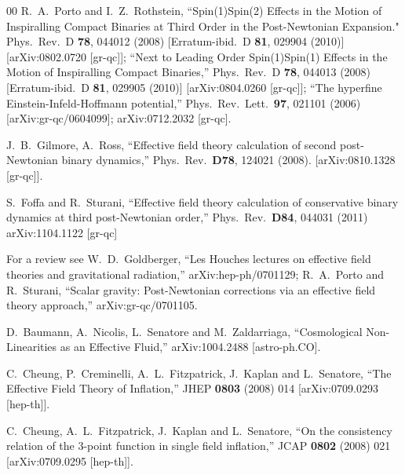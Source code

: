 \documentclass[11pt,amsmath,floats,floatfix,nofootinbib,secnumarabic, superscriptaddress, tightenlines]{revtex4}
\begin{document}
{\begin{thebibliography}{00}
 R.~A.~Porto and I.~Z.~Rothstein, ``Spin(1)Spin(2) Effects in the Motion of Inspiralling Compact Binaries at Third Order in the Post-Newtonian Expansion." Phys.\ Rev.\  D {\bf 78}, 044012 (2008) [Erratum-ibid.\  D {\bf 81}, 029904 (2010)] [arXiv:0802.0720 [gr-qc]];  ``Next to Leading Order Spin(1)Spin(1) Effects in the Motion of Inspiralling Compact Binaries,'' Phys.\ Rev.\  D {\bf 78}, 044013 (2008) [Erratum-ibid.\  D {\bf 81}, 029905 (2010)] [arXiv:0804.0260 [gr-qc]]; ``The hyperfine Einstein-Infeld-Hoffmann potential,''  Phys.\ Rev.\ Lett.\  {\bf 97}, 021101 (2006) [arXiv:gr-qc/0604099];  arXiv:0712.2032 [gr-qc].

 J.~B.~Gilmore, A.~Ross,
  ``Effective field theory calculation of second post-Newtonian binary dynamics,''
  Phys.\ Rev.\  {\bf D78}, 124021 (2008).
  [arXiv:0810.1328 [gr-qc]].
  
  S.~Foffa and R.~Sturani,
  ``Effective field theory calculation of conservative binary dynamics at third post-Newtonian order,''  Phys.\ Rev.\  {\bf D84}, 044031 (2011)
  arXiv:1104.1122 [gr-qc]
  
 For a review see  W.~D.~Goldberger,
  ``Les Houches lectures on effective field theories and gravitational
  radiation,''
  arXiv:hep-ph/0701129;  R.~A.~Porto and R.~Sturani,
  ``Scalar gravity: Post-Newtonian corrections via an effective field theory
  approach,'' arXiv:gr-qc/0701105.

  D.~Baumann, A.~Nicolis, L.~Senatore and M.~Zaldarriaga,
  ``Cosmological Non-Linearities as an Effective Fluid,''
  arXiv:1004.2488 [astro-ph.CO].

  C.~Cheung, P.~Creminelli, A.~L.~Fitzpatrick, J.~Kaplan and L.~Senatore,
  ``The Effective Field Theory of Inflation,''
  JHEP {\bf 0803} (2008) 014
  [arXiv:0709.0293 [hep-th]].

  C.~Cheung, A.~L.~Fitzpatrick, J.~Kaplan and L.~Senatore,
  ``On the consistency relation of the 3-point function in single field
  inflation,''
  JCAP {\bf 0802} (2008) 021
  [arXiv:0709.0295 [hep-th]].


\end{thebibliography}}
\end{document}
